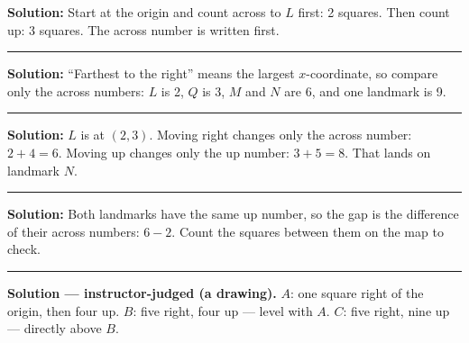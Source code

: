\documentclass[12pt]{article}
\begin{document}




\textbf{Solution:} Start at the origin and count across to $L$ first: 2 squares. Then count up: 3 squares. The across number is written first. 

\vspace{0.15cm}\noindent\rule{\linewidth}{0.2pt}\vspace{0.15cm}


\textbf{Solution:} ``Farthest to the right'' means the largest $x$-coordinate, so compare only the across numbers: $L$ is 2, $Q$ is 3, $M$ and $N$ are 6, and one landmark is 9. 

\vspace{0.15cm}\noindent\rule{\linewidth}{0.2pt}\vspace{0.15cm}


\textbf{Solution:} $L$ is at $(2, 3)$. Moving right changes only the across number: $2 + 4 = 6$. Moving up changes only the up number: $3 + 5 = 8$. That lands on landmark $N$. 

\vspace{0.15cm}\noindent\rule{\linewidth}{0.2pt}\vspace{0.15cm}


\textbf{Solution:} Both landmarks have the same up number, so the gap is the difference of their across numbers: $6 - 2$. Count the squares between them on the map to check. 

\vspace{0.15cm}\noindent\rule{\linewidth}{0.2pt}\vspace{0.15cm}


\textbf{Solution --- instructor-judged (a drawing).} $A$: one square right of the origin, then four up. $B$: five right, four up --- level with $A$. $C$: five right, nine up --- directly above $B$.
\end{document}
